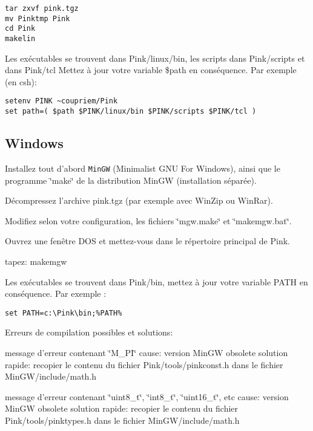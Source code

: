 \footnotesize\begin{verbatim}tar zxvf pink.tgz
mv Pinktmp Pink
cd Pink
makelin
\end{verbatim}
\normalsize


Les ex\'{e}cutables se trouvent dans Pink/linux/bin, les scripts dans Pink/scripts et dans Pink/tcl Mettez \`{a} jour votre variable \$path en cons\'{e}quence. Par exemple (en csh):



\footnotesize\begin{verbatim}setenv PINK ~coupriem/Pink
set path=( $path $PINK/linux/bin $PINK/scripts $PINK/tcl )
\end{verbatim}
\normalsize
\subsection{Windows}\label{index_windows}
Installez tout d'abord {\tt Min\-GW} (Minimalist GNU For Windows), ainsi que le programme \char`\"{}make\char`\"{} de la distribution Min\-GW (installation s\'{e}par\'{e}e).

D\'{e}compressez l'archive pink.tgz (par exemple avec Win\-Zip ou Win\-Rar).

Modifiez selon votre configuration, les fichiers \char`\"{}mgw.make\char`\"{} et \char`\"{}makemgw.bat\char`\"{}.

Ouvrez une fen\^{e}tre DOS et mettez-vous dans le r\'{e}pertoire principal de Pink.

tapez: makemgw

Les ex\'{e}cutables se trouvent dans Pink/bin, mettez \`{a} jour votre variable PATH en cons\'{e}quence. Par exemple :



\footnotesize\begin{verbatim}set PATH=c:\Pink\bin;%PATH%
\end{verbatim}
\normalsize


Erreurs de compilation possibles et solutions:

message d'erreur contenant \char`\"{}M\_\-PI\char`\"{} cause: version Min\-GW obsolete solution rapide: recopier le contenu du fichier Pink/tools/pinkconst.h dans le fichier Min\-GW/include/math.h

message d'erreur contenant \char`\"{}uint8\_\-t\char`\"{}, \char`\"{}int8\_\-t\char`\"{}, \char`\"{}uint16\_\-t\char`\"{}, etc cause: version Min\-GW obsolete solution rapide: recopier le contenu du fichier Pink/tools/pinktypes.h dans le fichier Min\-GW/include/math.h

